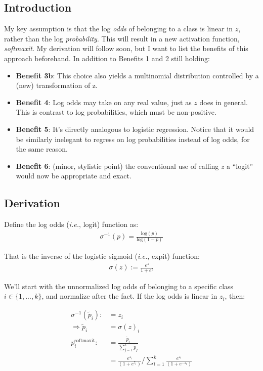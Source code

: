 \documentclass{article}
\begin{document}
\subsection{Introduction}
My key assumption is that the log \textit{odds} of belonging to a class is linear in $z$, rather than the log \textit{probability}. This will result in a new activation function, \textit{softmaxit}. My derivation will follow soon, but I want to list the benefits of this approach beforehand. In addition to Benefits 1 and 2 still holding:

\begin{itemize}
\item[]\textbf{Benefit 3b}: This choice also yields a multinomial distribution controlled by a (new) transformation of z.
\item[]\textbf{Benefit 4}: Log odds may take on any real value, just as $z$ does in general. This is contrast to log probabilities, which must be non-positive.
\item[]\textbf{Benefit 5}: It's directly analogous to logistic regression. Notice that it would be similarly inelegant to regress on log probabilities instead of log odds, for the same reason.
\item[]\textbf{Benefit 6}: (minor, stylistic point) the conventional use of calling $z$ a ``logit'' would now be appropriate and exact.
\end{itemize}

\subsection{Derivation}
Define the log odds (\textit{i.e.}, logit) function as:
\begin{align}
\sigma^{-1}(p)=\frac{\text{log}(p)}{\text{log}(1-p)}
\end{align}

That is the inverse of the logistic sigmoid (\textit{i.e.}, expit) function:
\begin{align}
\sigma(z) := \frac{e^z}{1+e^z}
\end{align}

We'll start with the unnormalized log odds of belonging to a specific class $i\in \{1,...,k\}$, and normalize after the fact. If the log odds is linear in $z_i$, then:

\begin{align}
\sigma^{-1}(\tilde{p}_i) :&= z_i \\
\Rightarrow\tilde{p}_i &= \sigma(z)_i \\
p_i^{\text{softmaxit}} :&= \frac{\tilde{p}_i}{\sum_{j=1}^k \tilde{p}_j} \\
&= \frac{e^{z_i}}{(1+e^{z_i})} \bigg/ \sum_{l=1}^k\frac{e^{z_l}}{(1+e^{-z_l})}
\end{align}
\end{document}
